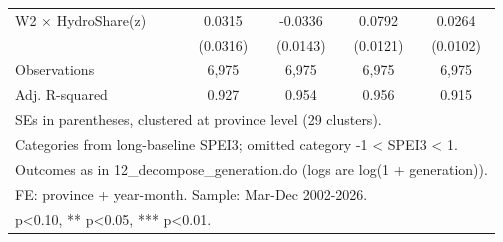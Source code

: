 {\begin{tabular}{l*{4}{c}}
\addlinespace
W2 $\times$ HydroShare(z)&      0.0315         &     -0.0336\sym{**} &      0.0792\sym{***}&      0.0264\sym{**} \\
                    &    (0.0316)         &    (0.0143)         &    (0.0121)         &    (0.0102)         \\
\midrule
Observations        &       6,975         &       6,975         &       6,975         &       6,975         \\
Adj. R-squared      &       0.927         &       0.954         &       0.956         &       0.915         \\
\bottomrule
\multicolumn{5}{l}{\footnotesize SEs in parentheses, clustered at province level (29 clusters).}\\
\multicolumn{5}{l}{\footnotesize Categories from long-baseline SPEI3; omitted category -1 < SPEI3 < 1.}\\
\multicolumn{5}{l}{\footnotesize Outcomes as in 12\_decompose\_generation.do (logs are log(1 + generation)).}\\
\multicolumn{5}{l}{\footnotesize FE: province + year-month. Sample: Mar-Dec 2002-2026.}\\
\multicolumn{5}{l}{\footnotesize * p<0.10, ** p<0.05, *** p<0.01.}\\
\end{tabular}
}
